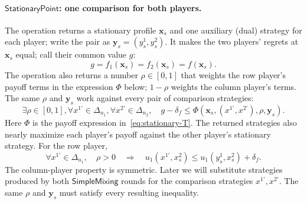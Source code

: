 \documentclass[11pt]{article}
\theoremstyle{remark}
\theoremstyle{plain}
\newcommand{\sm}{\mathsf{SimpleMixing}}
\newcommand{\spoint}{\mathsf{StationaryPoint}}
\begin{document}
\paragraph{\texorpdfstring{$\spoint$}{StationaryPoint}: one comparison for both players.}
The operation returns a stationary profile $\boldsymbol{x}_s$ and
one auxiliary (dual) strategy for each player; write the pair as
$\boldsymbol{y}_s=(y_s^1,y_s^2)$. It makes the two players' regrets at
$\boldsymbol{x}_s$ equal; call their common value $g$:
\begin{equation}
 g=f_1(\boldsymbol{x}_s)=f_2(\boldsymbol{x}_s)=f(\boldsymbol{x}_s).
 \label{eq:properties-g}
\end{equation}
The operation also returns a number $\rho\in[0,1]$ that weights the
row player's payoff terms in the expression $\Phi$ below; $1-\rho$
weights the column player's terms. The same $\rho$ and
$\boldsymbol y_s$ work against every pair of comparison strategies:
\begin{equation}
 \exists\rho\in[0,1],
 \forall x^{1\prime}\in\Delta_{n_1},
 \forall x^{2\prime}\in\Delta_{n_2},\quad
 g-\delta_f\le
 \Phi(\boldsymbol{x}_s,(x^{1\prime},x^{2\prime}),\rho,\boldsymbol{y}_s).
 \label{eq:properties-stationary}
\end{equation}
Here $\Phi$ is the payoff expression in~\eqref{eq:stationary-T}.
The returned strategies also nearly maximize each player's payoff
against the other player's stationary strategy. For the row player,
\begin{equation}
 \forall x^{1\prime}\in\Delta_{n_1},\quad
 \rho>0\quad\Longrightarrow\quad
 u_1(x^{1\prime},x_s^2)\le u_1(y_s^1,x_s^2)+\delta_f.
 \label{eq:properties-stationary-br}
\end{equation}
The column-player property is symmetric. Later we will substitute
strategies produced by both $\sm$ rounds for the comparison
strategies $x^{1\prime},x^{2\prime}$. The same
$\rho$ and $\boldsymbol y_s$ must satisfy every resulting inequality.
\end{document}
